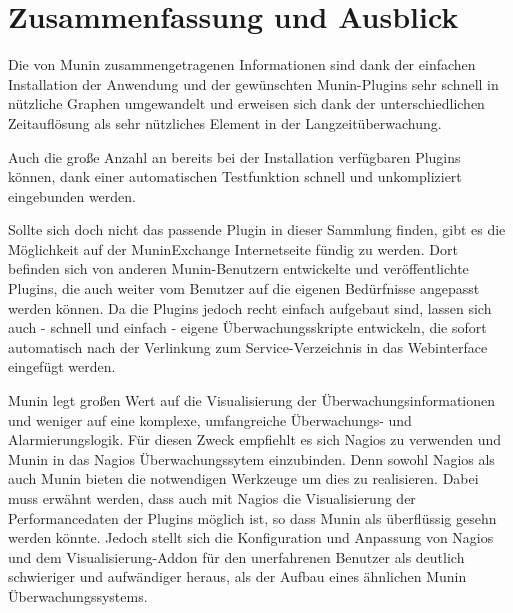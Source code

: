 \section{Zusammenfassung und Ausblick}
Die von Munin zusammengetragenen Informationen sind dank der einfachen Installation der Anwendung und der gewünschten Munin-Plugins sehr schnell in nützliche Graphen umgewandelt und erweisen sich dank der unterschiedlichen Zeitauflösung als sehr nützliches Element in der Langzeitüberwachung.

Auch die große Anzahl an bereits bei der Installation verfügbaren Plugins können, dank einer automatischen Testfunktion 
schnell und unkompliziert eingebunden werden.

Sollte sich doch nicht das passende Plugin in dieser Sammlung finden, gibt es die Möglichkeit auf der MuninExchange Internetseite fündig zu werden.
Dort befinden sich von anderen Munin-Benutzern entwickelte und veröffentlichte Plugins, die auch weiter vom Benutzer auf die eigenen Bedürfnisse angepasst werden können.
Da die Plugins jedoch recht einfach aufgebaut sind, lassen sich auch - schnell und einfach - eigene Überwachungsskripte entwickeln, die sofort automatisch nach der Verlinkung zum Service-Verzeichnis in das Webinterface eingefügt werden.

Munin legt großen Wert auf die Visualisierung der Überwachungsinformationen und weniger auf eine komplexe, umfangreiche Überwachungs- und Alarmierungslogik.
Für diesen Zweck empfiehlt es sich Nagios zu verwenden und Munin in das Nagios Überwachungssytem einzubinden.
Denn sowohl Nagios als auch Munin bieten die notwendigen Werkzeuge um dies zu realisieren.
Dabei muss erwähnt werden, dass auch mit Nagios die Visualisierung der Performancedaten der Plugins möglich ist, so dass Munin als überflüssig gesehn werden könnte.
Jedoch stellt sich die Konfiguration und Anpassung von Nagios und dem Visualisierung-Addon für den unerfahrenen Benutzer als deutlich schwieriger und aufwändiger heraus, als der Aufbau eines ähnlichen Munin Überwachungssystems.